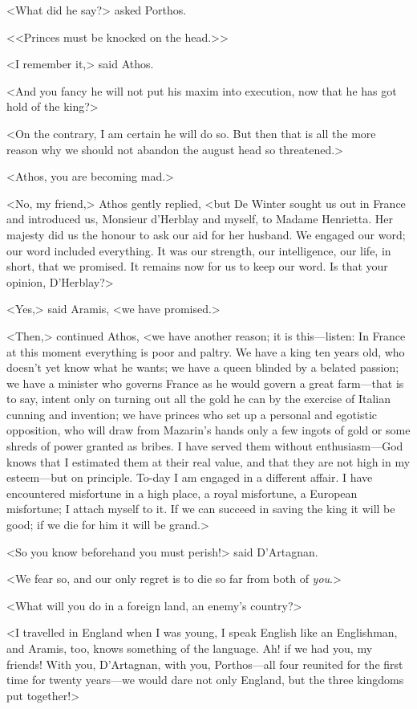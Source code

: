 <What did he say?> asked Porthos.

<<Princes must be knocked on the head.>>

<I remember it,> said Athos.

<And you fancy he will not put his maxim into execution, now that he has got hold of the king?>

<On the contrary, I am certain he will do so. But then that is all the more reason why we should not abandon the august head so threatened.>

<Athos, you are becoming mad.>

<No, my friend,> Athos gently replied, <but De Winter sought us out in France and introduced us, Monsieur d'Herblay and myself, to Madame Henrietta. Her majesty did us the honour to ask our aid for her husband. We engaged our word; our word included everything. It was our strength, our intelligence, our life, in short, that we promised. It remains now for us to keep our word. Is that your opinion, D'Herblay?>

<Yes,> said Aramis, <we have promised.>

<Then,> continued Athos, <we have another reason; it is this—listen: In France at this moment everything is poor and paltry. We have a king ten years old, who doesn't yet know what he wants; we have a queen blinded by a belated passion; we have a minister who governs France as he would govern a great farm—that is to say, intent only on turning out all the gold he can by the exercise of Italian cunning and invention; we have princes who set up a personal and egotistic opposition, who will draw from Mazarin's hands only a few ingots of gold or some shreds of power granted as bribes. I have served them without enthusiasm—God knows that I estimated them at their real value, and that they are not high in my esteem—but on principle. To-day I am engaged in a different affair. I have encountered misfortune in a high place, a royal misfortune, a European misfortune; I attach myself to it. If we can succeed in saving the king it will be good; if we die for him it will be grand.>

<So you know beforehand you must perish!> said D'Artagnan.

<We fear so, and our only regret is to die so far from both of \emph{you}.>

<What will you do in a foreign land, an enemy's country?>

<I travelled in England when I was young, I speak English like an Englishman, and Aramis, too, knows something of the language. Ah! if we had you, my friends! With you, D'Artagnan, with you, Porthos—all four reunited for the first time for twenty years—we would dare not only England, but the three kingdoms put together!>

